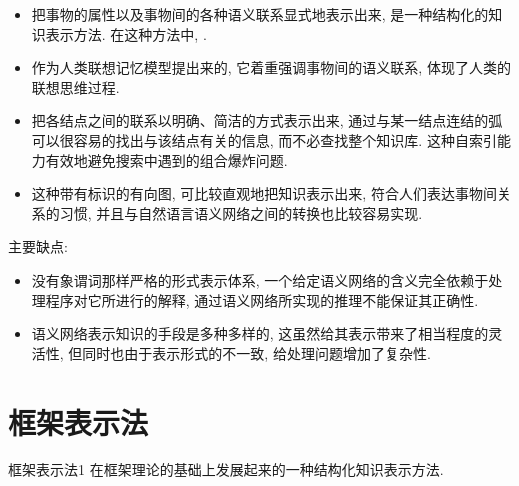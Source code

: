 \begin{itemize}
    \item {} 把事物的属性以及事物间的各种语义联系显式地表示出来, 是一种结构化的知识表示方法. 在这种方法中, .
    \item {} 作为人类联想记忆模型提出来的, 它着重强调事物间的语义联系, 体现了人类的联想思维过程.
    \item {} 把各结点之间的联系以明确、简洁的方式表示出来, 通过与某一结点连结的弧可以很容易的找出与该结点有关的信息, 而不必查找整个知识库. 这种自索引能力有效地避免搜索中遇到的组合爆炸问题.
    \item {} 这种带有标识的有向图, 可比较直观地把知识表示出来, 符合人们表达事物间关系的习惯, 并且与自然语言语义网络之间的转换也比较容易实现.
\end{itemize}
主要缺点:
\begin{itemize}
    \item {} 没有象谓词那样严格的形式表示体系, 一个给定语义网络的含义完全依赖于处理程序对它所进行的解释, 通过语义网络所实现的推理不能保证其正确性.
    \item {} 语义网络表示知识的手段是多种多样的, 这虽然给其表示带来了相当程度的灵活性, 但同时也由于表示形式的不一致, 给处理问题增加了复杂性.
\end{itemize}
\section{框架表示法}
\begin{mydef}{框架表示法}{1}
    在框架理论的基础上发展起来的一种结构化知识表示方法.
\end{mydef}
%
%
%
%
